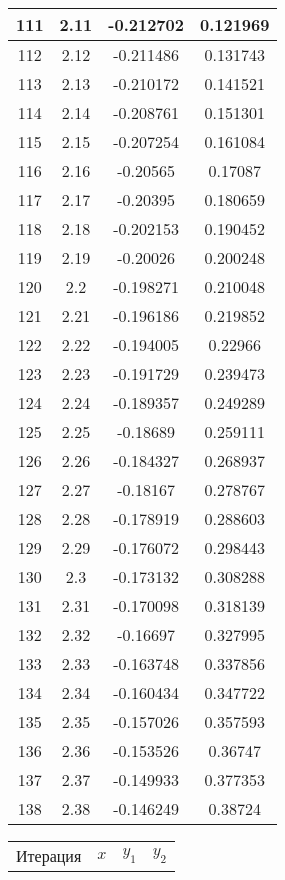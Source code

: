 \begin{center}
\begin{tabular}{|c|c|c|c|}
		\hline
		111 & 2.11 & -0.212702 & 0.121969 \\
		\hline
		112 & 2.12 & -0.211486 & 0.131743 \\
		\hline
		113 & 2.13 & -0.210172 & 0.141521 \\
		\hline
		114 & 2.14 & -0.208761 & 0.151301 \\
		\hline
		115 & 2.15 & -0.207254 & 0.161084 \\
		\hline
		116 & 2.16 & -0.20565 & 0.17087 \\
		\hline
		117 & 2.17 & -0.20395 & 0.180659 \\
		\hline
		118 & 2.18 & -0.202153 & 0.190452 \\
		\hline
		119 & 2.19 & -0.20026 & 0.200248 \\
		\hline
		120 & 2.2 & -0.198271 & 0.210048 \\
		\hline
		121 & 2.21 & -0.196186 & 0.219852 \\
		\hline
		122 & 2.22 & -0.194005 & 0.22966 \\
		\hline
		123 & 2.23 & -0.191729 & 0.239473 \\
		\hline
		124 & 2.24 & -0.189357 & 0.249289 \\
		\hline
		125 & 2.25 & -0.18689 & 0.259111 \\
		\hline
		126 & 2.26 & -0.184327 & 0.268937 \\
		\hline
		127 & 2.27 & -0.18167 & 0.278767 \\
		\hline
		128 & 2.28 & -0.178919 & 0.288603 \\
		\hline
		129 & 2.29 & -0.176072 & 0.298443 \\
		\hline
		130 & 2.3 & -0.173132 & 0.308288 \\
		\hline
		131 & 2.31 & -0.170098 & 0.318139 \\
		\hline
		132 & 2.32 & -0.16697 & 0.327995 \\
		\hline
		133 & 2.33 & -0.163748 & 0.337856 \\
		\hline
		134 & 2.34 & -0.160434 & 0.347722 \\
		\hline
		135 & 2.35 & -0.157026 & 0.357593 \\
		\hline
		136 & 2.36 & -0.153526 & 0.36747 \\
		\hline
		137 & 2.37 & -0.149933 & 0.377353 \\
		\hline
		138 & 2.38 & -0.146249 & 0.38724 \\
		\hline
	\end{tabular}
\begin{tabular}{|c|c|c|c|}
\hline
		Итерация & $ x $ & $ y_{1} $ & $ y_{2} $\\

\end{tabular}
\end{center}
